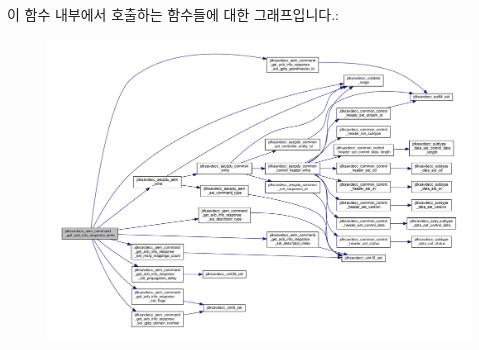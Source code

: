 이 함수 내부에서 호출하는 함수들에 대한 그래프입니다.\+:
\nopagebreak
\begin{figure}[H]
\begin{center}
\leavevmode
\includegraphics[width=350pt]{group__command__get__avb__info__response_gafc6f92f488c709adf3db3d02de405441_cgraph}
\end{center}
\end{figure}


